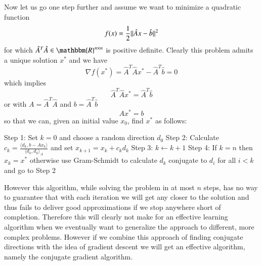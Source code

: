 \documentclass[preprint,12pt,3p]{elsarticle}
\begin{document}
Now let us go one step further and assume we want to minimize a quadratic function
$$f(x)=\frac{1}{2}\Arrowvert \hat{A}x-\hat{b}\Arrowvert^2$$
for which $\hat{A}^T\hat{A}\in\mathbbm{R}^{n\times n}$ is positive definite. Clearly this problem admits a unique solution $x^*$ and we have 
$$\nabla f(x^*)=\hat{A}^T\hat{A}x^*-\hat{A}^T\hat{b}=0$$
which implies
$$\hat{A}^T\hat{A}x^*=\hat{A}^T\hat{b}$$
or with $A=\hat{A}^T\hat{A}$ and $b=\hat{A}^T\hat{b}$
$$Ax^*=b$$
so that we can, given an initial value $x_0$, find $x^*$ as follows:
\vspace{0.4cm}
\begin{algorithmic}
\State Step 1: Set $k=0$ and choose a random direction $d_0$
\vspace{0.3cm}
\State Step 2: Calculate $c_k=\frac{\langle d_k, b-Ax_k\rangle}{\langle d_k,d_k\rangle_{A}}$ and set $x_{k+1}=x_k+c_kd_k$
\vspace{0.3cm}
\State Step 3: $k\gets k+1$ 
\vspace{0.3cm}
\State Step 4: If $k=n$ then $x_k=x^*$ otherwise use Gram-Schmidt to calculate  $d_k$ conjugate to \phantom{Step 4: }$d_i$ for all $i<k$ and go to Step 2
\end{algorithmic}
\vspace{0.4cm}
 However this algorithm, while solving the problem in at most $n$ steps, has no way to guarantee that with each iteration we will get any closer to the solution and thus fails to deliver good approximations if we stop anywhere short of completion. Therefore this will clearly not make for an effective learning algorithm when we eventually want to generalize the approach to different, more complex problems. However if we combine this approach of finding conjugate directions with the idea of gradient descent we will get an effective algorithm, namely the conjugate gradient algorithm. 
 
\end{document}
